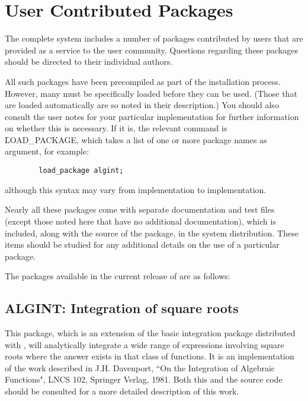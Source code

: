 \chapter{User Contributed Packages} 
\label{chap-user}
The complete {\REDUCE} system includes a number of packages contributed by
users that are provided as a service to the user community.  Questions
regarding these packages should be directed to their individual authors.

All such packages have been precompiled as part of the installation process.
However, many must be specifically loaded before they can be used. (Those
that are loaded automatically are so noted in their description.) You should
also consult the user notes for your particular implementation for further
information on whether this is necessary.  If it is, the relevant command is
\f{LOAD\_PACKAGE}, which takes a list of one or
more package names as argument, for example:

\begin{verbatim}
        load_package algint;
\end{verbatim}
although this syntax may vary from implementation to implementation.

Nearly all these packages come with separate documentation and test files
(except those noted here that have no additional documentation), which is
included, along with the source of the package, in the {\REDUCE} system
distribution.  These items should be studied for any additional details on
the use of a particular package.

\let\origsectionmark=\sectionmark
\def\sectionmark#1{}


The packages available in the current release of {\REDUCE} are as follows:

\section{ALGINT: Integration of square roots} 
\label{ALGINT}

This package, which is an extension of the basic integration package
distributed with {\REDUCE}, will analytically integrate a wide range of
expressions involving square roots where the answer exists in that class
of functions. It is an implementation of the work described in J.H.
Davenport, ``On the Integration of Algebraic Functions", LNCS 102,
Springer Verlag, 1981.  Both this and the source code should be consulted
for a more detailed description of this work.

